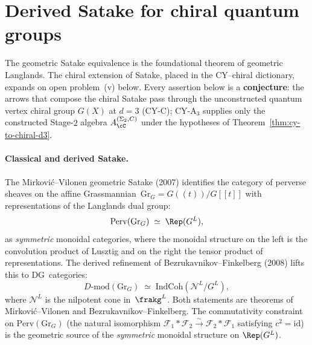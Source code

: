 \section{Derived Satake for chiral quantum groups}
\label{sec:derived-satake-chiral}

The geometric Satake equivalence is the foundational theorem of geometric Langlands.
The chiral extension of Satake, placed in the CY--chiral dictionary, expands on open problem~(v) below.
Every assertion below is a \textbf{conjecture}: the arrows that compose the chiral Satake pass through the unconstructed quantum vertex chiral group $G(X)$ at $d = 3$ (CY-C); CY-A$_3$ supplies only the constructed Stage-$2$ algebra \(A_\cC^{(\Sigma_2,C)}\) under the hypotheses of Theorem~\ref{thm:cy-to-chiral-d3}.

\paragraph{Classical and derived Satake.}
The Mirkovi\'c--Vilonen geometric Satake (2007) identifies the category of perverse sheaves on the affine Grassmannian~$\mathrm{Gr}_G = G(\!(t)\!)/G[\![t]\!]$ with representations of the Langlands dual group:
\[
 \mathrm{Perv}(\mathrm{Gr}_G) \;\simeq\; \Rep(G^L),
\]
as \emph{symmetric} monoidal categories, where the monoidal structure on the left is the convolution product of Lusztig and on the right the tensor product of representations.
The derived refinement of Bezrukavnikov--Finkelberg (2008) lifts this to DG~categories:
\[
 D\text{-}\mathrm{mod}(\mathrm{Gr}_G) \;\simeq\; \mathrm{IndCoh}(\mathcal{N}^L / G^L),
\]
where $\mathcal{N}^L$ is the nilpotent cone in~$\frakg^L$.
Both statements are theorems of Mirkovi\'c--Vilonen and Bezrukavnikov--Finkelberg.
The commutativity constraint on $\mathrm{Perv}(\mathrm{Gr}_G)$ (the natural isomorphism $\mathcal{F}_1 * \mathcal{F}_2 \xrightarrow{\sim} \mathcal{F}_2 * \mathcal{F}_1$ satisfying $c^2 = \mathrm{id}$) is the geometric source of the \emph{symmetric} monoidal structure on $\Rep(G^L)$.


